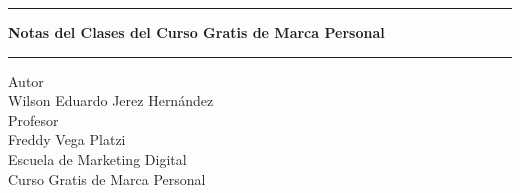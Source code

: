 \pagestyle{empty}
\begin{center}
\begin{figure}[h]
\centering


\end{figure}
\Large
\hrule
\vspace{4mm}
\textbf{Notas del Clases del Curso Gratis de Marca Personal}\\

\vspace{4mm}
\hrule
\large
\vfill
Autor\\

Wilson Eduardo Jerez Hernández \\
\vfill
Profesor\\

Freddy Vega
\vfill
Platzi\\
Escuela de Marketing Digital\\
Curso Gratis de Marca Personal\\
\end{center}
\newpage